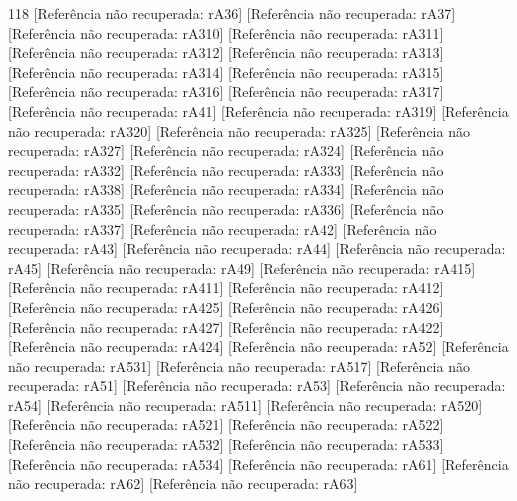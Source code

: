 \begin{thebibliography}{118}
 [Referência não recuperada: rA36]
 [Referência não recuperada: rA37]
 [Referência não recuperada: rA310]
 [Referência não recuperada: rA311]
 [Referência não recuperada: rA312]
 [Referência não recuperada: rA313]
 [Referência não recuperada: rA314]
 [Referência não recuperada: rA315]
 [Referência não recuperada: rA316]
 [Referência não recuperada: rA317]
 [Referência não recuperada: rA41]
 [Referência não recuperada: rA319]
 [Referência não recuperada: rA320]
 [Referência não recuperada: rA325]
 [Referência não recuperada: rA327]
 [Referência não recuperada: rA324]
 [Referência não recuperada: rA332]
 [Referência não recuperada: rA333]
 [Referência não recuperada: rA338]
 [Referência não recuperada: rA334]
 [Referência não recuperada: rA335]
 [Referência não recuperada: rA336]
 [Referência não recuperada: rA337]
 [Referência não recuperada: rA42]
 [Referência não recuperada: rA43]
 [Referência não recuperada: rA44]
 [Referência não recuperada: rA45]
 [Referência não recuperada: rA49]
 [Referência não recuperada: rA415]
 [Referência não recuperada: rA411]
 [Referência não recuperada: rA412]
 [Referência não recuperada: rA425]
 [Referência não recuperada: rA426]
 [Referência não recuperada: rA427]
 [Referência não recuperada: rA422]
 [Referência não recuperada: rA424]
 [Referência não recuperada: rA52]
 [Referência não recuperada: rA531]
 [Referência não recuperada: rA517]
 [Referência não recuperada: rA51]
 [Referência não recuperada: rA53]
 [Referência não recuperada: rA54]
 [Referência não recuperada: rA511]
 [Referência não recuperada: rA520]
 [Referência não recuperada: rA521]
 [Referência não recuperada: rA522]
 [Referência não recuperada: rA532]
 [Referência não recuperada: rA533]
 [Referência não recuperada: rA534]
 [Referência não recuperada: rA61]
 [Referência não recuperada: rA62]
 [Referência não recuperada: rA63]

\end{thebibliography}
